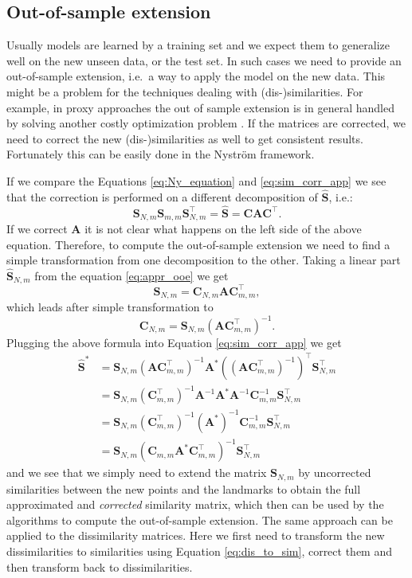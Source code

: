 \documentclass[twoside,11pt]{article}
\begin{document}
\subsection{Out-of-sample extension}
Usually models are learned by a training set
and we expect them to generalize well on the new unseen data, or the test set.
In such cases we need to provide an out-of-sample extension,
i.e.\ a way to apply the model on the new data.
This might be a problem for the techniques dealing with (dis-)similarities.
For example, in proxy approaches the out of sample extension is in general
handled by solving another costly optimization problem \cite{DBLP:conf/icml/ChenGR09,Lu30082005}.
If the matrices are corrected, we need to correct the new (dis-)similarities
as well to get consistent results. Fortunately this can be easily done in the
Nystr\"om framework. 

If we compare the Equations \eqref{eq:Ny_equation} and \eqref{eq:sim_corr_app}
we see that the correction is performed
on a different decomposition of $\mathbf{\hat{S}}$, i.e.:
\begin{equation}
\label{eq:appr_ooe}
\mathbf{S}_{N,m} \mathbf{S}_{m,m} \mathbf{S}_{N,m}^\top =
\mathbf{\hat{S}} = \mathbf{C} \mathbf{A} \mathbf{C}^\top.
\end{equation}
If we correct $\mathbf{A}$ it is not clear what happens on the left side
of the above equation.
Therefore, to compute the out-of-sample extension
we need to find a simple transformation
from one decomposition to the other.
Taking a linear part $\mathbf{\hat{S}}_{N,m}$ from the equation \ref{eq:appr_ooe}
we get
\[
\mathbf{S}_{N,m} =
\mathbf{C}_{N,m} \mathbf{A} \mathbf{C}_{m,m}^\top,
\]
which leads after simple transformation to
\[
\mathbf{C}_{N,m} = \mathbf{S}_{N,m}
\left( \mathbf{A} \mathbf{C}_{m,m}^\top \right)^{-1}.
\]
Plugging the above formula into Equation \eqref{eq:sim_corr_app} we get
\begin{align*}
\mathbf{\hat{S}}^* & =
\mathbf{S}_{N,m} \left( \mathbf{A} \mathbf{C}_{m,m}^\top \right)^{-1}
\mathbf{A}^*
\left(\left( \mathbf{A} \mathbf{C}_{m,m}^\top \right)^{-1}\right)^\top \mathbf{S}_{N,m}^\top\\
& = \mathbf{S}_{N,m} (\mathbf{C}_{m,m}^\top)^{-1}\mathbf{A}^{-1}
\mathbf{A}^*
\mathbf{A}^{-1}\mathbf{C}_{m,m}^{-1}\mathbf{S}_{N,m}^\top\\
& = \mathbf{S}_{N,m} (\mathbf{C}_{m,m}^\top)^{-1}
(\mathbf{A}^*)^{-1}
\mathbf{C}_{m,m}^{-1}\mathbf{S}_{N,m}^\top\\
& = \mathbf{S}_{N,m}
\left(\mathbf{C}_{m,m}\mathbf{A}^*\mathbf{C}_{m,m}^\top\right)^{-1}
\mathbf{S}_{N,m}^\top
\end{align*}
and we see that we simply need to extend the matrix $\mathbf{S}_{N,m}$
by uncorrected similarities between the new points and the landmarks to obtain
the full approximated and \emph{corrected} similarity matrix,
which then can be used by the algorithms to compute the out-of-sample extension.
The same approach can be applied to the dissimilarity matrices.
Here we first need to transform the new dissimilarities to similarities
using Equation \eqref{eq:dis_to_sim}, correct them and then
transform back to dissimilarities.
\end{document}

